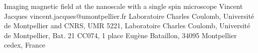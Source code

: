 \begin{conf-abstract}[]
{Imaging magnetic field at the nanoscale with a single spin microscope}
{\color{blue} Vincent Jacques}
{vincent.jacques@umontpellier.fr}
{Laboratoire Charles Coulomb, Université de Montpellier and CNRS, UMR 5221, Laboratoire Charles Coulomb, Université de Montpellier, Bat. 21 CC074, 1 place Eugène Bataillon, 34095 Montpellier cedex, France}
{\decofourleft \decofourright}





\printbibliography[heading=none]

\end{conf-abstract}
